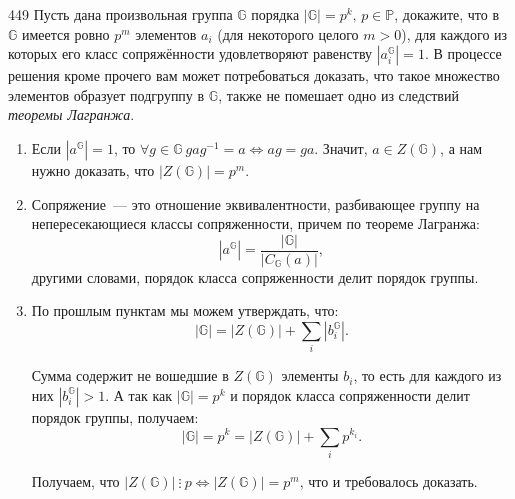 \begin{task}{449}
Пусть дана произвольная группа \(\mathbb{G}\) порядка \(\lvert\mathbb{G}\rvert = p^k,\, p\in\mathbb{P}\), докажите, что в \(\mathbb{G}\) имеется ровно \(p^m\) элементов \(a_i\) (для некоторого целого \(m>0\)), для каждого из которых его класс сопряжённости удовлетворяют равенству \(\left\lvert a_i^{\mathbb{G}}\right\rvert = 1\). В процессе решения кроме прочего вам может потребоваться доказать, что такое множество элементов образует подгруппу в \(\mathbb{G}\), также не помешает одно из следствий \emph{теоремы Лагранжа}.
\end{task}

\begin{solution}

\begin{enumerate}
    \item Если \(\left\lvert a^{\mathbb{G}}\right\rvert = 1\), то \(\forall g \in \mathbb{G}\:gag^{-1}=a \Leftrightarrow ag=ga\). Значит, \(a \in Z(\mathbb{G})\), а нам нужно доказать, что \(\left\lvert Z(\mathbb{G})\right\rvert = p^m\).

    \item Сопряжение~--- это отношение эквивалентности, разбивающее группу на непересекающиеся классы сопряженности, причем по теореме Лагранжа:
    \begin{equation*}
        \left\lvert a^{\mathbb{G}}\right\rvert = \frac{\left\lvert \mathbb{G}\right\rvert}{\left\lvert C_{\mathbb{G}}(a)\right\rvert},
    \end{equation*}
    другими словами, порядок класса сопряженности делит порядок группы.
    
    \item По прошлым пунктам мы можем утверждать, что:
    \begin{equation*}
        \left\lvert \mathbb{G}\right\rvert = \left\lvert Z(\mathbb{G})\right\rvert + \sum_i \left\lvert b_i^{\mathbb{G}}\right\rvert.
    \end{equation*}

    Сумма содержит не вошедшие в \(Z(\mathbb{G})\) элементы \(b_i\), то есть для каждого из них \(\left\lvert b_i^{\mathbb{G}}\right\rvert > 1\). А так как \(\lvert\mathbb{G}\rvert = p^k\) и порядок класса сопряженности делит порядок группы, получаем:
    \begin{equation*}
        \left\lvert \mathbb{G}\right\rvert = p^k = \left\lvert Z(\mathbb{G})\right\rvert + \sum_i p^{k_i}.
    \end{equation*}

    Получаем, что \(\left\lvert Z(\mathbb{G})\right\rvert\:\vdots\:p \Leftrightarrow \left\lvert Z(\mathbb{G})\right\rvert = p^m\), что и требовалось доказать.

\end{enumerate}

\end{solution}
